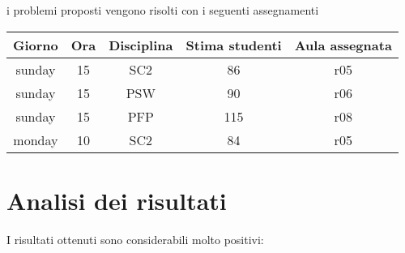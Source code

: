 \noindent
i problemi proposti vengono risolti con i seguenti assegnamenti

\begin{table}[h]
    \begin{small}
        \begin{center}
            \begin{tabular}[c]{c|c|c|c|c}
                Giorno & Ora & Disciplina & Stima studenti & Aula assegnata \\
                \hline
                sunday & 15 & SC2 & 86 & r05 \\
                sunday & 15 & PSW & 90 & r06 \\
                sunday & 15 & PFP & 115 & r08 \\
                monday & 10 & SC2 & 84 & r05
            \end{tabular}
        \end{center}
    \end{small}
\end{table}

\newpage

\section{Analisi dei risultati}

I risultati ottenuti sono considerabili molto positivi:

